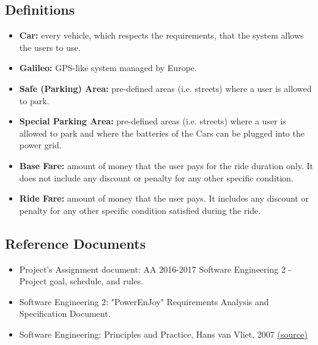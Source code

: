 \subsection{Definitions}
\begin{itemize}
    \item \textbf{Car:} every vehicle, which respects the requirements, that the system allows the users to use.
    \item \textbf{Galileo:} GPS-like system managed by Europe.
    \item \textbf{Safe (Parking) Area:} pre-defined areas (i.e. streets) where a user is allowed to park.
    \item \textbf{Special Parking Area:} pre-defined areas (i.e. streets) where a user is allowed to park and where the batteries of the Cars can be plugged into the power grid.
    \item \textbf{Base Fare:} amount of money that the user pays for the ride duration only. It does not include any discount or penalty for any other specific condition.
    \item \textbf{Ride Fare:} amount of money that the user pays. It includes any discount or penalty for any other specific condition satisfied during the ride.
\end{itemize}

\subsection{Reference Documents}
\begin{itemize}
    \item Project’s Assignment document: AA 2016-2017 Software Engineering 2 - Project goal, schedule, and rules.
    \item Software Engineering 2: "PowerEnJoy" Requirements Analysis and Specification Document.
    \item Software Engineering: Principles and Practice, Hans van Vliet, 2007 \href{https://github.com/EdoardoZ/SoftEng2/raw/master/PP/References/Software\%20Engineering\%20-\%20Principles\%20and\%20Practice.pdf}{
    (\underline{source})}
\end{itemize}